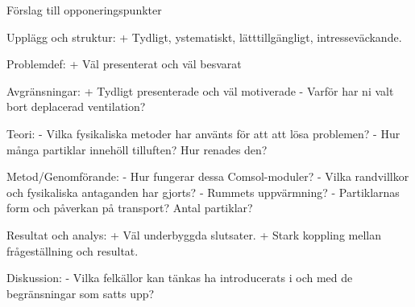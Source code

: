 Förslag till opponeringspunkter

Upplägg och struktur:
	+ Tydligt, ystematiskt, lätttillgängligt, intresseväckande.

Problemdef:
	+ Väl presenterat och väl besvarat

Avgränsningar:
	+ Tydligt presenterade och väl motiverade
	- Varför har ni valt bort deplacerad ventilation?

Teori:
	- Vilka fysikaliska metoder har använts för att att lösa problemen?
	- Hur många partiklar innehöll tilluften? Hur renades den?

Metod/Genomförande: 
	- Hur fungerar dessa Comsol-moduler?
	- Vilka randvillkor och fysikaliska antaganden har gjorts?
	- Rummets uppvärmning?
	- Partiklarnas form och påverkan på transport? Antal partiklar?

Resultat och analys:
	+ Väl underbyggda slutsater.
	+ Stark koppling mellan frågeställning och resultat.

Diskussion:
	- Vilka felkällor kan tänkas ha introducerats i och med de begränsningar som 	satts upp?
